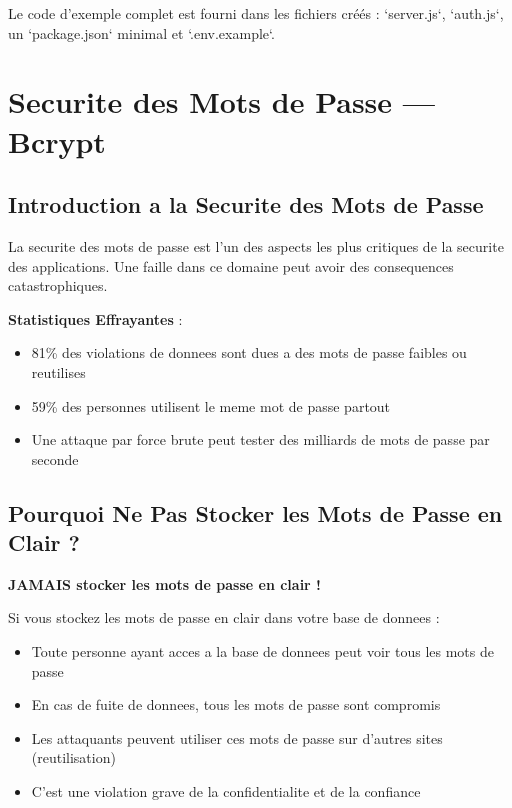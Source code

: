 \documentclass[a4paper,12pt]{book}
\begin{document}
Le code d'exemple complet est fourni dans les fichiers créés : `server.js`,
`auth.js`, un `package.json` minimal et `.env.example`.



\chapter{Securite des Mots de Passe — Bcrypt}

\section{Introduction a la Securite des Mots de Passe}

La securite des mots de passe est l'un des aspects les plus critiques de la securite des applications. Une faille dans ce domaine peut avoir des consequences catastrophiques.

\begin{securitybox}
    \textbf{Statistiques Effrayantes} :
    \begin{itemize}
        \item 81\% des violations de donnees sont dues a des mots de passe faibles ou reutilises
        \item 59\% des personnes utilisent le meme mot de passe partout
        \item Une attaque par force brute peut tester des milliards de mots de passe par seconde
    \end{itemize}
\end{securitybox}

\section{Pourquoi Ne Pas Stocker les Mots de Passe en Clair ?}

\begin{errorbox}
    \textbf{JAMAIS stocker les mots de passe en clair !}

    Si vous stockez les mots de passe en clair dans votre base de donnees :
    \begin{itemize}
        \item Toute personne ayant acces a la base de donnees peut voir tous les mots de passe
        \item En cas de fuite de donnees, tous les mots de passe sont compromis
        \item Les attaquants peuvent utiliser ces mots de passe sur d'autres sites (reutilisation)
        \item C'est une violation grave de la confidentialite et de la confiance
    \end{itemize}
\end{errorbox}
\end{document}
